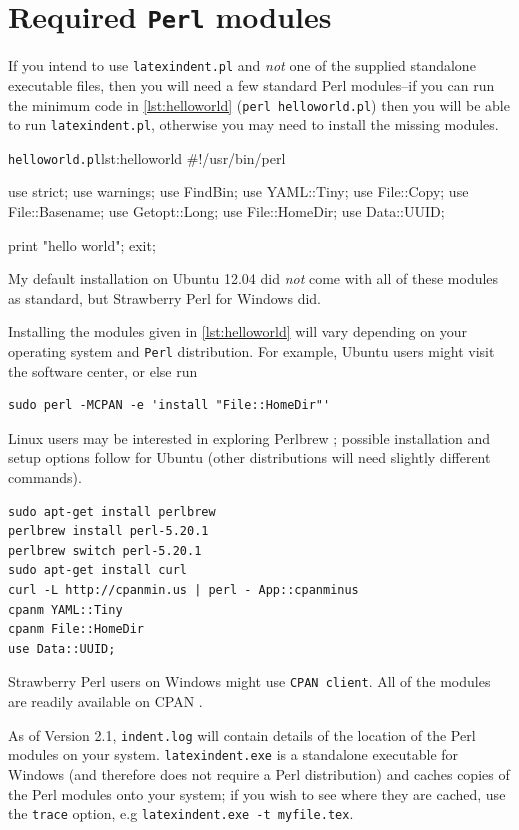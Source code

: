 \documentclass[11pt]{article}
\begin{document}
\appendix
\section{Required \lstinline!Perl! modules}\label{sec:requiredmodules}
If you intend to use \lstinline!latexindent.pl! and \emph{not} one of the supplied standalone executable files, then you will need a few standard Perl modules--if you can run the
minimum code in \cref{lst:helloworld} (\lstinline!perl helloworld.pl!) then you will be able to run \lstinline!latexindent.pl!, otherwise you may
need to install the missing modules.

\begin{cmhlistings}[language=Perl]{\lstinline!helloworld.pl!}{lst:helloworld}
#!/usr/bin/perl

use strict;
use warnings;
use FindBin;
use YAML::Tiny;
use File::Copy;
use File::Basename;
use Getopt::Long;
use File::HomeDir;
use Data::UUID;

print "hello world";
exit;
\end{cmhlistings}
My default installation on Ubuntu 12.04 did \emph{not} come
with all of these modules as standard, but Strawberry Perl for Windows \cite{strawberryperl}
did.

Installing the modules given in \cref{lst:helloworld} will vary depending on your
operating system and \lstinline!Perl! distribution. For example, Ubuntu users
might visit the software center, or else run
\begin{lstlisting}[numbers=none]
sudo perl -MCPAN -e 'install "File::HomeDir"'
\end{lstlisting}

Linux users may be interested in exploring Perlbrew \cite{perlbrew}; possible installation and setup 
options follow for Ubuntu (other distributions will need slightly different commands).
\begin{lstlisting}[numbers=none]
sudo apt-get install perlbrew
perlbrew install perl-5.20.1
perlbrew switch perl-5.20.1
sudo apt-get install curl
curl -L http://cpanmin.us | perl - App::cpanminus
cpanm YAML::Tiny
cpanm File::HomeDir
use Data::UUID;
\end{lstlisting}

Strawberry Perl users on Windows might use
\lstinline!CPAN client!. All of the modules are readily available on CPAN \cite{cpan}.

As of Version 2.1,  \lstinline!indent.log! will contain details of the location
of the Perl modules on your system.  \lstinline!latexindent.exe! is a standalone
executable for Windows (and therefore does not require a Perl distribution) and caches copies of the Perl modules onto your system; if you
wish to see where they are cached, use the  \lstinline!trace! option, e.g  \lstinline!latexindent.exe -t myfile.tex!.
\end{document}
